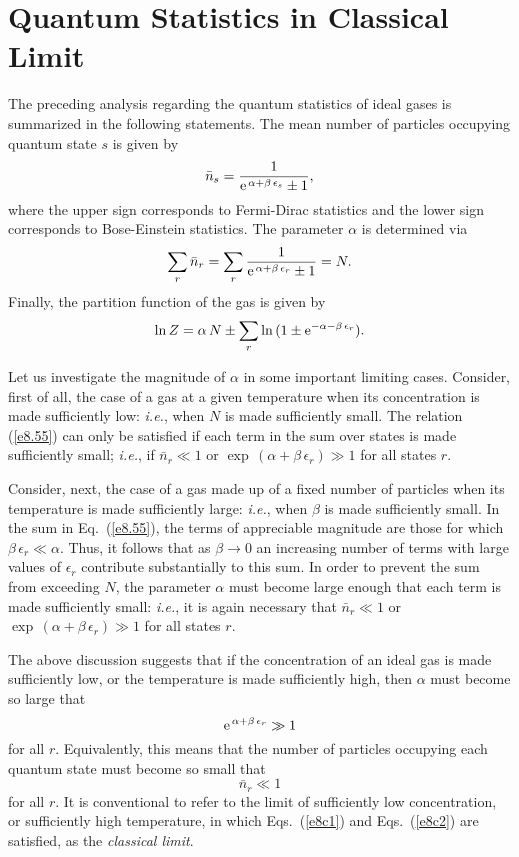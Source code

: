 \section{Quantum Statistics in Classical Limit}
The preceding analysis regarding the quantum statistics of ideal
gases is summarized in the following statements. The mean number of
particles occupying quantum state $s$ is given by
\begin{equation}\label{e8.54}
\bar{n}_s = \frac{1}{{\rm e}^{\,\alpha+\beta\,\epsilon_s} \pm 1},
\end{equation}
where the upper sign corresponds to Fermi-Dirac statistics and the
lower sign corresponds to Bose-Einstein statistics. The parameter
$\alpha$ is determined via
\begin{equation}\label{e8.55}
\sum_r \bar{n}_r = \sum_r \frac{1}{{\rm e}^{\,\alpha+\beta\,\epsilon_r} \pm 1}
=N.
\end{equation}
Finally, the partition function of the gas is given by
\begin{equation}\label{e8.56}
\ln Z = \alpha\,N \pm \sum_r \ln\,(1\pm {\rm e}^{-\alpha-\beta\,\epsilon_r}).
\end{equation}

Let us investigate the magnitude of $\alpha$ in some important limiting
cases. Consider, first of all, the case of a gas at a given temperature
when its concentration is made sufficiently low: {\em i.e.}, when
$N$ is made sufficiently small. The relation (\ref{e8.55}) can only
be satisfied if each term in the sum over states is made 
sufficiently small; {\em i.e.}, if $\bar{n}_r\ll 1$ or $\exp\,(\alpha +
\beta\,\epsilon_r)\gg 1$ for all states $r$. 

Consider, next, the case of a gas made up of a fixed number of particles
when its temperature is made sufficiently large: {\em i.e.}, when $\beta$ is
made sufficiently small. In the sum in Eq.~(\ref{e8.55}), the terms of
appreciable magnitude are those for which $\beta\,\epsilon_r\ll \alpha$. 
Thus, it follows that as $\beta\rightarrow 0$ an increasing number of
terms with large values of $\epsilon_r$ contribute substantially to this
sum. In order to prevent the sum from exceeding $N$, the parameter $\alpha$
must become large enough that each term is made sufficiently small: {\em i.e.},
it is again necessary that $\bar{n}_r\ll 1$ or  $\exp\,(\alpha +
\beta\,\epsilon_r)\gg 1$ for all states $r$. 

The above discussion suggests that if the concentration of an ideal
gas is made sufficiently low, or the temperature is made sufficiently high,
then $\alpha$ must become so large that
\begin{equation}
{\rm e}^{\,\alpha+\beta\,\epsilon_r}\gg 1\label{e8c1}
\end{equation}
for all $r$. Equivalently, this means that the  number of particles occupying
each quantum state must
become so small that
\begin{equation}
\bar{n}_r \ll 1\label{e8c2}
\end{equation}
for all $r$. It is conventional to refer to the limit of sufficiently
low concentration, or sufficiently high temperature, in which Eqs.~(\ref{e8c1})
and Eqs.~(\ref{e8c2}) are satisfied, as the {\em classical limit}.

